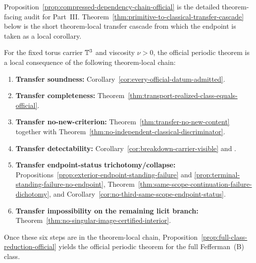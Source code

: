 \begin{remark}\label{rem:detail-vs-short-spine}
Proposition~\ref{prop:compressed-dependency-chain-official} is the detailed theorem-facing audit for
Part~III. Theorem~\ref{thm:primitive-to-classical-transfer-cascade} below is the short theorem-local transfer cascade from which the endpoint is taken as a local corollary.
\end{remark}

\begin{theorem}\label{thm:primitive-to-classical-transfer-cascade}
For the fixed torus carrier $\mathbb{T}^3$ and viscosity $\nu>0$, the official periodic theorem is a local consequence of the following theorem-local chain:
\begin{enumerate}[label=(\roman*), leftmargin=2.2em]
\item \textbf{Transfer soundness:} Corollary~\ref{cor:every-official-datum-admitted}.
\item \textbf{Transfer completeness:} Theorem~\ref{thm:transport-realized-class-equals-official}.
\item \textbf{Transfer no-new-criterion:} Theorem~\ref{thm:transfer-no-new-content} together with Theorem~\ref{thm:no-independent-classical-discriminator}.
\item \textbf{Transfer detectability:} Corollary~\ref{cor:breakdown-carrier-visible} and \HorizonDetectabilityRef{}.
\item \textbf{Transfer endpoint-status trichotomy/collapse:} Propositions~\ref{prop:exterior-endpoint-standing-failure} and \ref{prop:terminal-standing-failure-no-endpoint}, Theorem~\ref{thm:same-scope-continuation-failure-dichotomy}, and Corollary~\ref{cor:no-third-same-scope-endpoint-status}.
\item \textbf{Transfer impossibility on the remaining licit branch:} Theorem~\ref{thm:no-singular-image-certified-interior}.
\end{enumerate}
Once these six steps are in the theorem-local chain, Proposition~\ref{prop:full-class-reduction-official} yields the official periodic theorem for the full Fefferman~(B) class.
\end{theorem}


